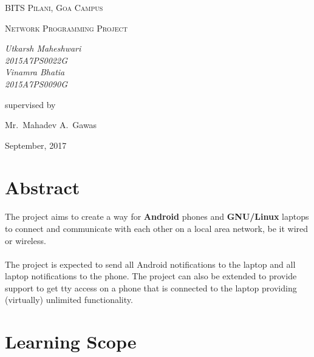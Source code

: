 \documentclass[12pt, letterpaper, titlepage]{article}
\begin{document}
\begin{titlepage}
	\centering
	{\scshape\LARGE BITS Pilani, Goa Campus \par}
	\vspace{1cm}
	{\scshape\Large Network Programming Project\par}
	\vspace{2cm}
	{\large\textit{Utkarsh Maheshwari\\2015A7PS0022G\\
	Vinamra Bhatia\\2015A7PS0090G}}

	\vfill
	supervised by\par
	Mr.~Mahadev A.~Gawas
	\vfill

    {\large September, 2017}
\end{titlepage}

\tableofcontents
\newpage


\section{Abstract}

    \paragraph{}
    The project aims to create a way for \textbf{Android} phones and
    \textbf{GNU/Linux} laptops to connect and communicate with each other on a
    local area network, be it wired or wireless.

    \paragraph{}
    The project is expected to send all Android notifications to the laptop and
    all laptop notifications to the phone. The project can also be extended to
    provide support to get tty access on a phone that is connected to the
    laptop providing (virtually) unlimited functionality.


\section{Learning Scope}
\end{document}
